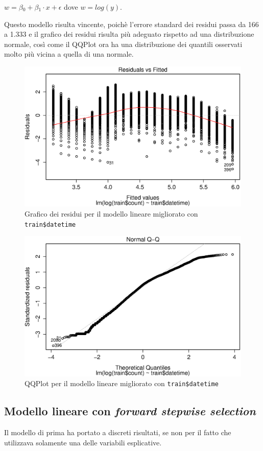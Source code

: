 \centering $ w = \beta{}_0 + \beta{}_1 \cdot{} x + \epsilon{} $
\flushleft dove $ w = log(y) $.

Questo modello risulta vincente, poichè l'errore standard dei residui passa da
166 a 1.333 e il grafico dei residui risulta più adeguato rispetto ad una
distribuzione normale, così come il QQPlot ora ha una distribuzione dei
quantili osservati molto più vicina a quella di una normale.

\begin{figure}[H]
  \centering
  \includegraphics[width=.7\columnwidth]{images/simple-lm-log-residuals.eps}
  \caption{Grafico dei residui per il modello lineare migliorato con
  \texttt{train\$datetime}}\label{fig:simpl-lm-log-residuals}
\end{figure}

\begin{figure}[H]
  \centering
  \includegraphics[width=.7\columnwidth]{images/simple-lm-log-qqplot.eps}
  \caption{QQPlot per il modello lineare migliorato con
  \texttt{train\$datetime}}\label{fig:simpl-lm-log-qqplot}
\end{figure}

\subsection{Modello lineare con \emph{forward stepwise selection}}
Il modello di prima ha portato a discreti risultati, se non per il fatto che
utilizzava solamente una delle variabili esplicative.

